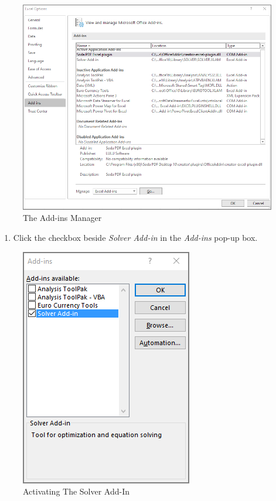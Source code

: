 \begin{figure}[H]
\centering
\includegraphics[width=\maxwidth{.95\linewidth}]{gfx/ch08_fig71}
\caption{The Add-ins Manager}
\label{08:fig71}
\end{figure}

\begin{enumerate}[resume]	
	
	\item Click the checkbox beside \textit{Solver Add-in} in the \textit{Add-ins} pop-up box.
	
\end{enumerate}

\begin{figure}[H]
	\centering
	\includegraphics[width=\maxwidth{.65\linewidth}]{gfx/ch08_fig72}
	\caption{Activating The Solver Add-In}
	\label{08:fig72}
\end{figure}

